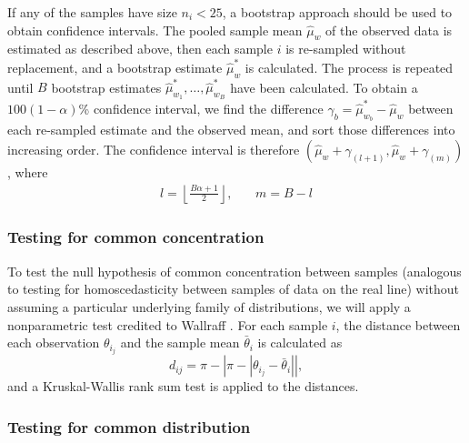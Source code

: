 \documentclass[../../ArchStats.tex]{subfiles}
\begin{document}
If any of the samples have size $n_i < 25$, a bootstrap approach should be used to obtain confidence intervals. The pooled sample mean $\hat{\mu}_w$ of the observed data is estimated as described above, then each sample $i$ is re-sampled without replacement, and a bootstrap estimate $\hat{\mu}^*_w$ is calculated. The process is repeated until $B$ bootstrap estimates $\hat{\mu}^*_{w_1}, \dots, \hat{\mu}^*_{w_B}$ have been calculated. To obtain a $100(1-\alpha)$\% confidence interval, we find the difference $\gamma_b = \hat{\mu}^*_{w_b} - \hat{\mu}_w$ between each re-sampled estimate and the observed mean, and sort those differences into increasing order. The confidence interval is therefore $(\hat{\mu}_w + \gamma_{(l+1)}, \hat{\mu}_w + \gamma_{(m)})$, where
	\begin{equation}
	\begin{matrix*}
	l = \left\lfloor \frac{B\alpha + 1}{2} \right\rfloor, & \, & m = B-l
	\end{matrix*}
 	\end{equation}

\subsubsection{Testing for common concentration}
\label{sec:common-concentration}

To test the null hypothesis of common concentration between samples (analogous to testing for homoscedasticity between samples of data on the real line) without assuming a particular underlying family of distributions, we will apply a nonparametric test credited to Wallraff \cite{Wallraff1979}. For each sample $i$, the distance between each observation $\theta_{i_j}$ and the sample mean $\bar{\theta}_i$ is calculated as
	\begin{equation}
	d_{ij} = \pi - \left\vert \pi - \left\vert \theta_{i_j} - 	\bar{\theta}_i \right\vert \right\vert,
	\end{equation}
and a Kruskal-Wallis rank sum test is applied to the distances. 

\subsubsection{Testing for common distribution}
\end{document}
